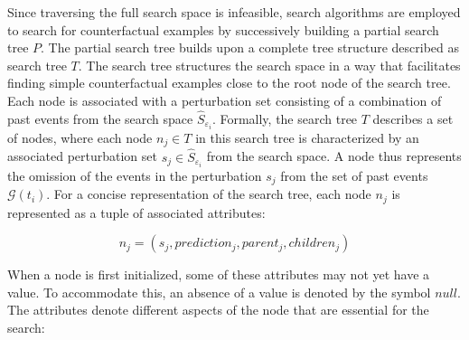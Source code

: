 Since traversing the full search space is infeasible, search algorithms are employed to search for counterfactual examples by successively building a partial search tree $P$. The partial search tree builds upon a complete tree structure described as search tree $T$. The search tree structures the search space in a way that facilitates finding simple counterfactual examples close to the root node of the search tree. Each node is associated with a perturbation set consisting of a combination of past events from the search space $\hat{S}_{\varepsilon_i}$. Formally, the search tree $T$ describes a set of nodes, where each node $n_j \in T$ in this search tree is characterized by an associated perturbation set $s_j \in \hat{S}_{\varepsilon_i}$ from the search space. A node thus represents the omission of the events in the perturbation $s_j$ from the set of past events $\mathcal{G}(t_i)$. For a concise representation of the search tree, each node $n_j$ is represented as a tuple of associated attributes:


\begin{equation}
    \label{e_search_tree_simple}
    n_j = (s_j, prediction_j, parent_j, children_j)
\end{equation}

When a node is first initialized, some of these attributes may not yet have a value. To accommodate this, an absence of a value is denoted by the symbol $null$. The attributes denote different aspects of the node that are essential for the search:


